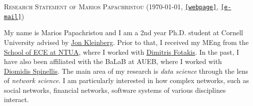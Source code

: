 \documentclass[11pt]{article}
\begin{document}
\begin{center}
\large \textsc{Research Statement of Marios Papachristou} \normalsize {(\today, \href{https://papachristoumarios.github.io}{\texttt{[webpage]}}, \href{mailto:papachristoumarios@cs.cornell.edu}{\texttt{[e-mail]}})} 
\end{center}

\medskip


My name is Marios Papachristou and I am a 2nd year Ph.D. student at Cornell University advised by \href{https://www.cs.cornell.edu/home/kleinber}{Jon Kleinberg}. Prior to that, I received my MEng from the \href{https://www.ece.ntua.gr/gr}{School of ECE at NTUA}, where I worked with \href{http://www.softlab.ntua.gr/~fotakis/}{Dimitris Fotakis}. In the past, I have also been affiliated with the BaLaB at AUEB, where I worked with \href{https://www2.dmst.aueb.gr/dds}{Diomidis Spinellis}. The main area of my research is \emph{data science} through the lens of \emph{network science}. I am particularly interested in how complex networks, such as social networks,  financial networks, software systems  of various disciplines interact. 
\end{document}
